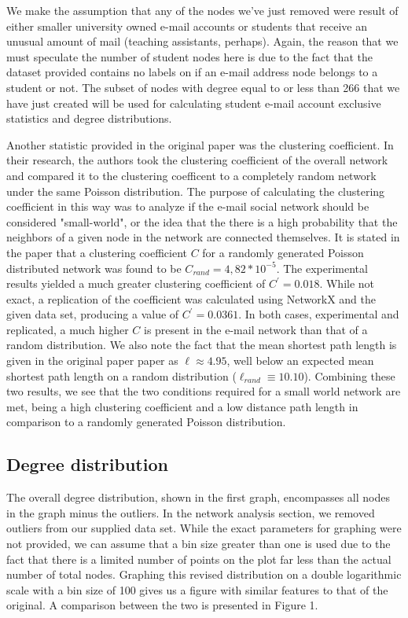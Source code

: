 \documentclass[11pt]{article}
\begin{document}
\begin{multicols}{2}
We make the assumption that any of the nodes we've just removed were result of either smaller university owned e-mail accounts or students that receive an unusual amount of mail (teaching assistants, perhaps). Again, the reason that we must speculate the number of student nodes here is due to the fact that the dataset provided contains no labels on if an e-mail address node belongs to a student or not. The subset of nodes with degree equal to or less than 266 that we have just created will be used for calculating student e-mail account exclusive statistics and degree distributions.

Another statistic provided in the original paper was the clustering coefficient. In their research, the authors took the clustering coefficient of the overall network and compared it to the clustering coefficent to a completely random network under the same Poisson distribution. The purpose of calculating the clustering coefficient in this way was to analyze if the e-mail social network should be considered "small-world", or the idea that the there is a high probability that the neighbors of a given node in the network are connected themselves. It is stated in the paper that a clustering coefficient \(C\) for a randomly generated Poisson distributed network was found to be \(C_{rand} = 4,82*10^{-5}\). The experimental results yielded a much greater clustering coefficient of \(C^{'}=0.018\). While not exact, a replication of the coefficient was calculated using NetworkX and the given data set, producing a value of \(C^{'}=0.0361\). In both cases, experimental and replicated, a much higher \(C\) is present in the e-mail network than that of a random distribution. We also note the fact that the mean shortest path length is given in the original paper paper as \(\ell \approx 4.95\), well below an expected mean shortest path length on a random distribution (\(\ell_{rand}\equiv 10.10\)). Combining these two results, we see that the two conditions required for a small world network are met, being a high clustering coefficient and a low distance path length in comparison to a randomly generated Poisson distribution.

\subsection{Degree distribution}
\hspace*{\parindent}The overall degree distribution, shown in the first graph, encompasses all nodes in the graph minus the outliers. In the network analysis section, we removed outliers from our supplied data set. While the exact parameters for graphing were not provided, we can assume that a bin size greater than one is used due to the fact that there is a limited number of points on the plot far less than the actual number of total nodes. Graphing this revised distribution on a double logarithmic scale with a bin size of 100 gives us a figure with similar features to that of the original. A comparison between the two is presented in Figure 1.


\end{multicols}
\end{document}
